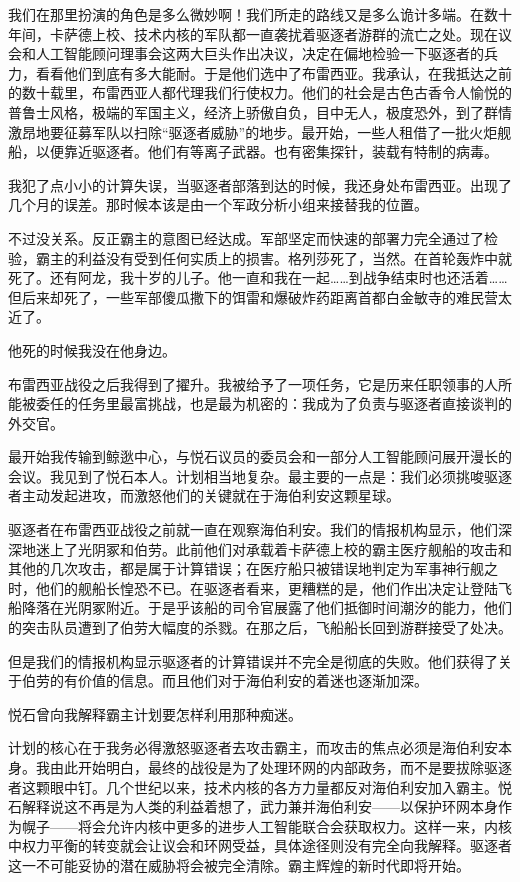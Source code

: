 \documentclass[
  b5paper, 
  10pt, 
  AutoFakeBold, 
  AutoFakeSlant
]{article}
\begin{document}
我们在那里扮演的角色是多么微妙啊！我们所走的路线又是多么诡计多端。在数十年间，卡萨德上校、技术内核的军队都一直袭扰着驱逐者游群的流亡之处。现在议会和人工智能顾问理事会这两大巨头作出决议，决定在偏地检验一下驱逐者的兵力，看看他们到底有多大能耐。于是他们选中了布雷西亚。我承认，在我抵达之前的数十载里，布雷西亚人都代理我们行使权力。他们的社会是古色古香令人愉悦的普鲁士风格，极端的军国主义，经济上骄傲自负，目中无人，极度恐外，到了群情激昂地要征募军队以扫除“驱逐者威胁”的地步。最开始，一些人租借了一批火炬舰船，以便靠近驱逐者。他们有等离子武器。也有密集探针，装载有特制的病毒。

我犯了点小小的计算失误，当驱逐者部落到达的时候，我还身处布雷西亚。出现了几个月的误差。那时候本该是由一个军政分析小组来接替我的位置。

不过没关系。反正霸主的意图已经达成。军部坚定而快速的部署力完全通过了检验，霸主的利益没有受到任何实质上的损害。格列莎死了，当然。在首轮轰炸中就死了。还有阿龙，我十岁的儿子。他一直和我在一起……到战争结束时也还活着……但后来却死了，一些军部傻瓜撒下的饵雷和爆破炸药距离首都白金敏寺的难民营太近了。

他死的时候我没在他身边。

布雷西亚战役之后我得到了擢升。我被给予了一项任务，它是历来任职领事的人所能被委任的任务里最富挑战，也是最为机密的：我成为了负责与驱逐者直接谈判的外交官。

最开始我传输到鲸逖中心，与悦石议员的委员会和一部分人工智能顾问展开漫长的会议。我见到了悦石本人。计划相当地复杂。最主要的一点是：我们必须挑唆驱逐者主动发起进攻，而激怒他们的关键就在于海伯利安这颗星球。

驱逐者在布雷西亚战役之前就一直在观察海伯利安。我们的情报机构显示，他们深深地迷上了光阴冢和伯劳。此前他们对承载着卡萨德上校的霸主医疗舰船的攻击和其他的几次攻击，都是属于计算错误；在医疗船只被错误地判定为军事神行舰之时，他们的舰船长惶恐不已。在驱逐者看来，更糟糕的是，他们作出决定让登陆飞船降落在光阴冢附近。于是乎该船的司令官展露了他们抵御时间潮汐的能力，他们的突击队员遭到了伯劳大幅度的杀戮。在那之后，飞船船长回到游群接受了处决。

但是我们的情报机构显示驱逐者的计算错误并不完全是彻底的失败。他们获得了关于伯劳的有价值的信息。而且他们对于海伯利安的着迷也逐渐加深。

悦石曾向我解释霸主计划要怎样利用那种痴迷。

计划的核心在于我务必得激怒驱逐者去攻击霸主，而攻击的焦点必须是海伯利安本身。我由此开始明白，最终的战役是为了处理环网的内部政务，而不是要拔除驱逐者这颗眼中钉。几个世纪以来，技术内核的各方力量都反对海伯利安加入霸主。悦石解释说这不再是为人类的利益着想了，武力兼并海伯利安——以保护环网本身作为幌子——将会允许内核中更多的进步人工智能联合会获取权力。这样一来，内核中权力平衡的转变就会让议会和环网受益，具体途径则没有完全向我解释。驱逐者这一不可能妥协的潜在威胁将会被完全清除。霸主辉煌的新时代即将开始。
\end{document}
